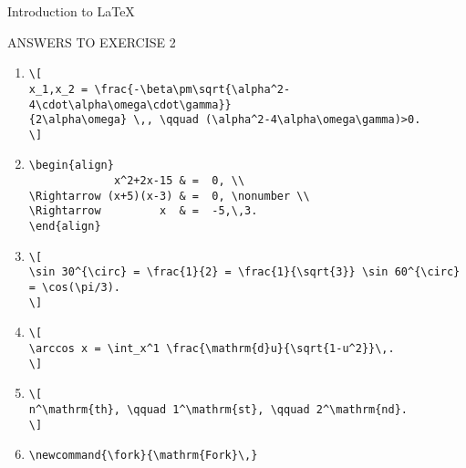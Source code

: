 \documentclass[a4paper,11pt,twoside]{article}
\begin{document}
\begin{center}

{\Large Introduction to \LaTeX}
\vspace{0.2cm}

{\Large ANSWERS TO EXERCISE 2}

\end{center}

\vspace{0.5cm}

\begin{enumerate}
\item 
\begin{verbatim}
\[
x_1,x_2 = \frac{-\beta\pm\sqrt{\alpha^2-4\cdot\alpha\omega\cdot\gamma}}
{2\alpha\omega} \,, \qquad (\alpha^2-4\alpha\omega\gamma)>0.
\]
\end{verbatim}

\item
\begin{verbatim}
\begin{align}
             x^2+2x-15 & =  0, \\
\Rightarrow (x+5)(x-3) & =  0, \nonumber \\
\Rightarrow         x  & =  -5,\,3.
\end{align}
\end{verbatim}

\item 
\begin{verbatim}
\[
\sin 30^{\circ} = \frac{1}{2} = \frac{1}{\sqrt{3}} \sin 60^{\circ}
= \cos(\pi/3).
\]
\end{verbatim}


\item 
\begin{verbatim}
\[
\arccos x = \int_x^1 \frac{\mathrm{d}u}{\sqrt{1-u^2}}\,.
\]
\end{verbatim}

\item 
\begin{verbatim} 
\[ 
n^\mathrm{th}, \qquad 1^\mathrm{st}, \qquad 2^\mathrm{nd}. 
\]
\end{verbatim}

\item 
\begin{verbatim} 
\newcommand{\fork}{\mathrm{Fork}\,}
\end{verbatim}
\end{enumerate}
\end{document}
